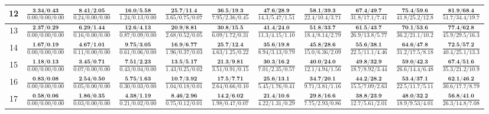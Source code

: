 \documentclass{slides}
\begin{document}
{{{\begin{tabular}{|c|c|c|c|c|c|c|c|c|c|c|}
\hline
12 & $\frac{\textbf{3.34/0.43}}{0.00/0.00/0.00}$ & $\frac{\textbf{8.41/2.05}}{0.24/0.00/0.00}$ & $\frac{\textbf{16.0/5.58}}{1.24/0.13/0.00}$ & $\frac{\textbf{25.7/11.4}}{3.65/0.75/0.07}$ & $\frac{\textbf{36.5/19.3}}{7.95/2.36/0.45}$ & $\frac{\textbf{47.6/28.9}}{14.3/5.47/1.51}$ & $\frac{\textbf{58.1/39.3}}{22.4/10.4/3.71}$ & $\frac{\textbf{67.4/49.7}}{31.8/17.1/7.41}$ & $\frac{\textbf{75.4/59.6}}{41.8/25.2/12.8}$ & $\frac{\textbf{81.9/68.4}}{51.7/34.4/19.7}$ \\
\hline
13 & $\frac{\textbf{2.37/0.29}}{0.00/0.00/0.00}$ & $\frac{\textbf{6.29/1.44}}{0.16/0.00/0.00}$ & $\frac{\textbf{12.6/4.13}}{0.87/0.09/0.00}$ & $\frac{\textbf{20.9/8.81}}{2.68/0.52/0.05}$ & $\frac{\textbf{30.8/15.5}}{6.09/1.72/0.31}$ & $\frac{\textbf{41.4/24.0}}{11.3/4.15/1.10}$ & $\frac{\textbf{51.8/33.7}}{18.4/8.14/2.79}$ & $\frac{\textbf{61.5/43.7}}{26.9/13.8/5.77}$ & $\frac{\textbf{70.1/53.6}}{36.2/21.1/10.2}$ & $\frac{\textbf{77.4/62.8}}{45.9/29.5/16.3}$ \\
\hline
14 & $\frac{\textbf{1.67/0.19}}{0.00/0.00/0.00}$ & $\frac{\textbf{4.67/1.01}}{0.11/0.00/0.00}$ & $\frac{\textbf{9.75/3.05}}{0.61/0.06/0.00}$ & $\frac{\textbf{16.9/6.77}}{1.96/0.37/0.03}$ & $\frac{\textbf{25.7/12.4}}{4.63/1.25/0.22}$ & $\frac{\textbf{35.6/19.8}}{8.94/3.13/0.79}$ & $\frac{\textbf{45.8/28.6}}{15.0/6.36/2.09}$ & $\frac{\textbf{55.6/38.1}}{22.5/11.1/4.46}$ & $\frac{\textbf{64.6/47.8}}{31.2/17.5/8.18}$ & $\frac{\textbf{72.5/57.2}}{40.4/25.1/13.3}$ \\
\hline
15 & $\frac{\textbf{1.18/0.13}}{0.00/0.00/0.00}$ & $\frac{\textbf{3.45/0.71}}{0.07/0.00/0.00}$ & $\frac{\textbf{7.51/2.23}}{0.43/0.04/0.00}$ & $\frac{\textbf{13.5/5.17}}{1.43/0.25/0.02}$ & $\frac{\textbf{21.3/9.81}}{3.51/0.91/0.15}$ & $\frac{\textbf{30.3/16.2}}{7.01/2.35/0.57}$ & $\frac{\textbf{40.0/24.0}}{12.1/4.94/1.56}$ & $\frac{\textbf{49.8/32.9}}{18.7/8.92/3.44}$ & $\frac{\textbf{59.0/42.3}}{26.6/14.4/6.48}$ & $\frac{\textbf{67.4/51.6}}{35.3/21.2/10.9}$ \\
\hline
16 & $\frac{\textbf{0.83/0.08}}{0.00/0.00/0.00}$ & $\frac{\textbf{2.54/0.50}}{0.05/0.00/0.00}$ & $\frac{\textbf{5.75/1.63}}{0.30/0.03/0.00}$ & $\frac{\textbf{10.7/3.92}}{1.04/0.18/0.01}$ & $\frac{\textbf{17.5/7.71}}{2.64/0.66/0.10}$ & $\frac{\textbf{25.6/13.1}}{5.45/1.76/0.41}$ & $\frac{\textbf{34.7/20.1}}{9.71/3.81/1.16}$ & $\frac{\textbf{44.2/28.2}}{15.5/7.09/2.63}$ & $\frac{\textbf{53.4/37.1}}{22.5/11.7/5.11}$ & $\frac{\textbf{62.1/46.2}}{30.6/17.7/8.79}$ \\
\hline
17 & $\frac{\textbf{0.58/0.06}}{0.00/0.00/0.00}$ & $\frac{\textbf{1.86/0.35}}{0.03/0.00/0.00}$ & $\frac{\textbf{4.38/1.19}}{0.21/0.02/0.00}$ & $\frac{\textbf{8.46/2.96}}{0.75/0.12/0.01}$ & $\frac{\textbf{14.2/6.02}}{1.98/0.47/0.07}$ & $\frac{\textbf{21.4/10.6}}{4.22/1.31/0.29}$ & $\frac{\textbf{29.8/16.6}}{7.75/2.93/0.86}$ & $\frac{\textbf{38.8/23.9}}{12.7/5.61/2.01}$ & $\frac{\textbf{48.0/32.2}}{18.9/9.53/4.01}$ & $\frac{\textbf{56.8/41.0}}{26.3/14.8/7.08}$ \\

\end{tabular}}}}
\end{document}
